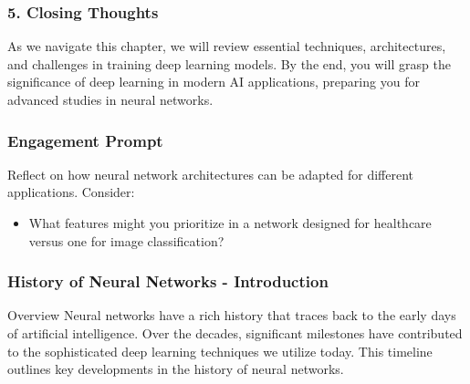 \documentclass[aspectratio=169]{beamer}
\begin{document}
\begin{frame}[fragile]
    \frametitle{5. Closing Thoughts}
    As we navigate this chapter, we will review essential techniques, architectures, and challenges in training deep learning models. 
    By the end, you will grasp the significance of deep learning in modern AI applications, preparing you for advanced studies in neural networks.
\end{frame}

\begin{frame}[fragile]
    \frametitle{Engagement Prompt}
    Reflect on how neural network architectures can be adapted for different applications. Consider: 
    \begin{itemize}
        \item What features might you prioritize in a network designed for healthcare versus one for image classification?
    \end{itemize}
\end{frame}

\begin{frame}[fragile]
    \frametitle{History of Neural Networks - Introduction}
    \begin{block}{Overview}
        Neural networks have a rich history that traces back to the early days of artificial intelligence. Over the decades, significant milestones have contributed to the sophisticated deep learning techniques we utilize today. This timeline outlines key developments in the history of neural networks.
    \end{block}
\end{frame}
\end{document}
